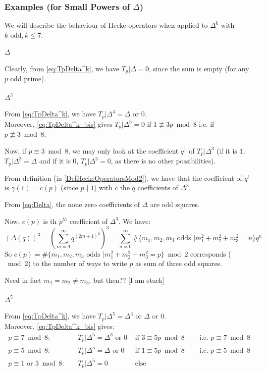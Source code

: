 \subsubsection{Examples (for Small Powers of $\Delta$)}
We will describe the behaviour of Hecke operators when applied to $\Delta^k$ with $k \text{ odd}, k \leq 7$.

\paragraph{$\Delta$}
Clearly, from \eqref{eq:TpDelta^k}, we have $T_p|\Delta = 0$, since the sum is empty (for any $p$ odd prime).

\paragraph{$\Delta^3$}
From \eqref{eq:TpDelta^k}, we have $T_p|\Delta^3 = \Delta \text{ or } 0$.\\
Moreover, \eqref{eq:TpDelta^k_bis} gives $T_p|\Delta^3 = 0$ if $1 \not\equiv 3p \bmod 8$ i.e. if $p \not\equiv 3 \bmod 8$.

Now, if $p \equiv 3 \bmod 8$, we may only look at the coefficient $q^1$ of $T_p|\Delta^3$ (if it is $1$, $T_p|\Delta^3 = \Delta$ and if it is $0$, $T_p|\Delta^3 = 0$, as there is no other possibilities).

From definition (in \ref{DefHeckeOperatorsMod2}), we have that the coefficient of $q^1$ is $\gamma(1) = c(p)$ (since $p \nmid 1$) with $c$ the $q$ coefficients of $\Delta^3$.

From \eqref{eq:Delta}, the none zero coefficients of $\Delta$ are odd squares.

Now, $c(p)$ is th $p^{th}$ coefficient of $\Delta^3$. We have:
$$
\left( \Delta(q) \right)^3
= \left( \sum_{m=0}^{\infty} q^{(2m+1)^2} \right)^3
= \sum_{n=0}^{\infty} \#\{m_1, m_2, m_3 \text{ odds } | m_1^2 + m_2^2 + m_3^2 = n\} q^n
$$
So $c(p) = \#\{m_1, m_2, m_3 \text{ odds } | m_1^2 + m_2^2 + m_3^2 = p\} \bmod 2$ corresponds ($\bmod 2$) to the number of ways to write $p$ as sum of three odd squares.



Need in fact $m_1 = m_2 \neq m_3$, but then??
[I am stuck]






\paragraph{$\Delta^5$}
From \eqref{eq:TpDelta^k}, we have $T_p|\Delta^5 = \Delta^3 \text{ or } \Delta \text{ or } 0$.\\
Moreover, \eqref{eq:TpDelta^k_bis} gives:
\begin{align*}
	p \equiv 7 \bmod 8: & \quad T_p|\Delta^5 = \Delta^3 \text{ or } 0 & \text{ if } 3 \equiv 5p \bmod 8 & \quad \text{ i.e. } p \equiv 7 \bmod 8 \\
	p \equiv 5 \bmod 8: & \quad T_p|\Delta^5 = \Delta \text{ or } 0 & \text{ if } 1 \equiv 5p \bmod 8 & \quad \text{ i.e. } p \equiv 5 \bmod 8 \\
	p \equiv 1 \text{ or } 3 \bmod 8: & \quad T_p|\Delta^5 = 0 & \text{ else } &
\end{align*}

